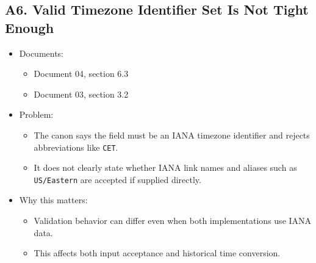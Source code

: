 \documentclass[11pt]{article}
\begin{document}
\subsection{A6. Valid Timezone Identifier Set Is Not Tight Enough}
\label{sec:orgdba5557}
\begin{itemize}
\item Documents:
\begin{itemize}
\item Document 04, section 6.3
\item Document 03, section 3.2
\end{itemize}
\item Problem:
\begin{itemize}
\item The canon says the field must be an IANA timezone identifier and rejects abbreviations like \texttt{CET}.
\item It does not clearly state whether IANA link names and aliases such as \texttt{US/Eastern} are accepted if supplied directly.
\end{itemize}
\item Why this matters:
\begin{itemize}
\item Validation behavior can differ even when both implementations use IANA data.
\item This affects both input acceptance and historical time conversion.
\end{itemize}
\end{itemize}
\end{document}
